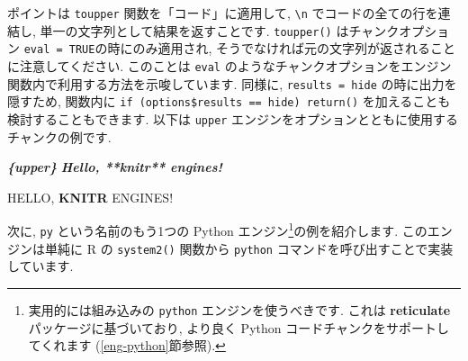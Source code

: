 \documentclass[
  11pt,
  lualatex,ja=standard,jafont=noto]{bxjsreport}
\newenvironment{Shaded}{\begin{snugshade}}{\end{snugshade}}
\newcommand{\AttributeTok}[1]{\textcolor[rgb]{0.77,0.63,0.00}{#1}}
\newcommand{\ConstantTok}[1]{\textcolor[rgb]{0.00,0.00,0.00}{#1}}
\newcommand{\ControlFlowTok}[1]{\textcolor[rgb]{0.13,0.29,0.53}{\textbf{#1}}}
\newcommand{\FunctionTok}[1]{\textcolor[rgb]{0.00,0.00,0.00}{#1}}
\newcommand{\InformationTok}[1]{\textcolor[rgb]{0.56,0.35,0.01}{\textbf{\textit{#1}}}}
\newcommand{\NormalTok}[1]{#1}
\newcommand{\OtherTok}[1]{\textcolor[rgb]{0.56,0.35,0.01}{#1}}
\newcommand{\SpecialCharTok}[1]{\textcolor[rgb]{0.00,0.00,0.00}{#1}}
\newcommand{\StringTok}[1]{\textcolor[rgb]{0.31,0.60,0.02}{#1}}
\renewenvironment{quote}{\def\FrameCommand{{\color{quotebarcolor}{\vrule width 3pt}}\hspace{10pt}}\MakeFramed{\advance\hsize-\width\FrameRestore}}{\endMakeFramed}
\begin{document}
ポイントは \texttt{toupper} 関数を「コード」に適用して, \texttt{\textbackslash{}n} でコードの全ての行を連結し, 単一の文字列として結果を返すことです. \texttt{toupper()} はチャンクオプション \texttt{eval = TRUE}の時にのみ適用され, そうでなければ元の文字列が返されることに注意してください. このことは \texttt{eval} のようなチャンクオプションをエンジン関数内で利用する方法を示唆しています. 同様に, \texttt{results = \textquotesingle{}hide\textquotesingle{}} の時に出力を隠すため, 関数内に \texttt{if (options\$results == \textquotesingle{}hide\textquotesingle{})\ return()} を加えることも検討することもできます. 以下は \texttt{upper} エンジンをオプションとともに使用するチャンクの例です.

\begin{quote}
\begin{Shaded}
\begin{Highlighting}[]
\InformationTok{\textasciigrave{}\textasciigrave{}\textasciigrave{}\{upper\}}
\InformationTok{Hello, **knitr** engines!}
\InformationTok{\textasciigrave{}\textasciigrave{}\textasciigrave{}}
\end{Highlighting}
\end{Shaded}

HELLO, \textbf{KNITR} ENGINES!
\end{quote}

次に, \texttt{py} という名前のもう1つの Python エンジン\footnote{実用的には組み込みの \texttt{python} エンジンを使うべきです. これは \textbf{reticulate} パッケージに基づいており, より良く Python コードチャンクをサポートしてくれます (\ref{eng-python}節参照).}の例を紹介します. このエンジンは単純に R の \texttt{system2()} 関数から \texttt{python} コマンドを呼び出すことで実装しています.

\begin{Shaded}
\end{Shaded}
\end{document}
